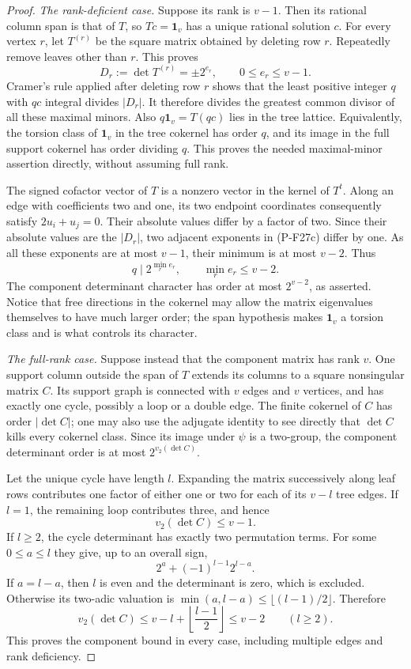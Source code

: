 \documentclass[11pt,a4paper]{article}
\begin{document}
\begin{proof}
\emph{The rank-deficient case.}
Suppose its rank is $v-1$. Then its rational column span
is that of $T$, so $Tc=\mathbf1_v$ has a unique rational
solution $c$. For every vertex $r$, let $T^{(r)}$ be the
square matrix obtained by deleting row $r$. Repeatedly
remove leaves other than $r$. This proves
\[
 D_r:=\det T^{(r)}=\pm2^{e_r},\qquad 0\le e_r\le v-1.
 \tag{P-F27c}
\]
Cramer's rule applied after deleting row $r$ shows that
the least positive integer $q$ with $qc$ integral divides
$|D_r|$. It therefore divides the greatest common divisor
of all these maximal minors. Also
$q\mathbf1_v=T(qc)$ lies in the tree lattice. Equivalently,
the torsion class of $\mathbf1_v$ in the tree cokernel has
order $q$, and its image in the full support cokernel has
order dividing $q$. This proves the needed maximal-minor
assertion directly, without assuming full rank.

The signed cofactor vector of $T$ is a nonzero vector
in the kernel of $T^t$. Along an edge with coefficients
two and one, its two endpoint coordinates consequently
satisfy $2u_i+u_j=0$. Their absolute values differ by a
factor of two. Since their absolute values are the
$|D_r|$, two adjacent exponents in (P-F27c) differ by one.
As all these exponents are at most $v-1$, their minimum
is at most $v-2$. Thus
\[
 q\mid 2^{\min_r e_r},\qquad \min_r e_r\le v-2.
 \tag{P-F27d}
\]
The component determinant character has order at most
$2^{v-2}$, as asserted. Notice that free directions in
the cokernel may allow the matrix eigenvalues themselves
to have much larger order; the span hypothesis makes
$\mathbf1_v$ a torsion class and is what controls its
character.

\emph{The full-rank case.}
Suppose instead that the component matrix has rank $v$.
One support column outside the span of $T$ extends its
columns to a square nonsingular matrix $C$. Its support
graph is connected with $v$ edges and $v$ vertices, and
has exactly one cycle, possibly a loop or a double edge.
The finite cokernel of $C$ has order $|\det C|$; one may
also use the adjugate identity to see directly that
$\det C$ kills every cokernel class. Since its image under
$\psi$ is a two-group, the component determinant order
is at most $2^{v_2(\det C)}$.

Let the unique cycle have length $l$. Expanding the
matrix successively along leaf rows contributes one
factor of either one or two for each of its $v-l$
tree edges. If $l=1$, the remaining loop contributes
three, and hence
\[
 v_2(\det C)\le v-1.
 \tag{P-F27e}
\]
If $l\ge2$, the cycle determinant has exactly two
permutation terms. For some $0\le a\le l$ they give,
up to an overall sign,
\[
 2^a+(-1)^{l-1}2^{l-a}.
 \tag{P-F27f}
\]
If $a=l-a$, then $l$ is even and the determinant is zero,
which is excluded. Otherwise its two-adic valuation is
$\min(a,l-a)\le\lfloor(l-1)/2\rfloor$. Therefore
\[
 v_2(\det C)
 \le v-l+\left\lfloor\frac{l-1}{2}\right\rfloor
 \le v-2\qquad(l\ge2).
 \tag{P-F27g}
\]
This proves the component bound in every case, including
multiple edges and rank deficiency.


\end{proof}
\end{document}
